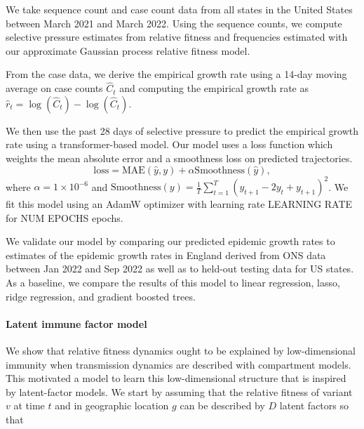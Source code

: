 \documentclass[12pt,oneside,letterpaper]{article}
\begin{document}
We take sequence count and case count data from all states in the United States between March 2021 and March 2022.
Using the sequence counts, we compute selective pressure estimates from relative fitness and frequencies estimated with our approximate Gaussian process relative fitness model.

From the case data, we derive the empirical growth rate using a 14-day moving average on case counts $\hat{C}_{t}$ and computing the empirical growth rate as $\hat{r}_{t} = \log(\hat{C}_{t}) - \log(\hat{C}_{t})$.

We then use the past 28 days of selective pressure to predict the empirical growth rate using a transformer-based model.
Our model uses a loss function which weights the mean absolute error and a smoothness loss on predicted trajectories.
\begin{equation*}
    \text{loss} = \text{MAE}(\hat{y}, y) + \alpha \text{Smoothness}(\hat{y}),
\end{equation*}
where $\alpha = 1\times 10^{-6}$ and $\text{Smoothness}(y) = \frac{1}{T}\sum_{t=1}^{T} (y_{t+1} - 2 y_{t} + y_{t+1})^{2}$.
We fit this model using an AdamW optimizer with learning rate LEARNING RATE for NUM EPOCHS epochs.

We validate our model by comparing our predicted epidemic growth rates to estimates of the epidemic growth rates in England derived from ONS data between Jan 2022 and Sep 2022 as well as to held-out testing data for US states.
As a baseline, we compare the results of this model to linear regression, lasso, ridge regression, and gradient boosted trees.


\paragraph{Latent immune factor model}%

We show that relative fitness dynamics ought to be explained by low-dimensional immunity when transmission dynamics are described with compartment models.
This motivated a model to learn this low-dimensional structure that is inspired by latent-factor models.
We start by assuming that the relative fitness of variant $v$ at time $t$ and in geographic location $g$ can be described by $D$ latent factors so that
\end{document}
